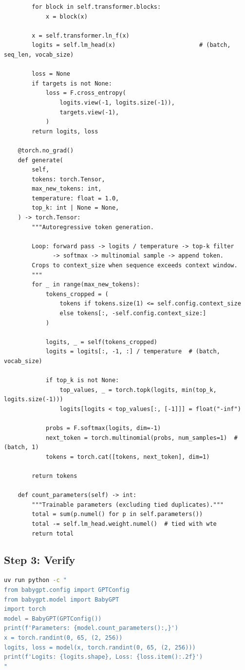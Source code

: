 \begin{lstlisting}
        for block in self.transformer.blocks:
            x = block(x)

        x = self.transformer.ln_f(x)
        logits = self.lm_head(x)                        # (batch, seq_len, vocab_size)

        loss = None
        if targets is not None:
            loss = F.cross_entropy(
                logits.view(-1, logits.size(-1)),
                targets.view(-1),
            )
        return logits, loss

    @torch.no_grad()
    def generate(
        self,
        tokens: torch.Tensor,
        max_new_tokens: int,
        temperature: float = 1.0,
        top_k: int | None = None,
    ) -> torch.Tensor:
        """Autoregressive token generation.

        Loop: forward pass -> logits / temperature -> top-k filter
              -> softmax -> multinomial sample -> append token.
        Crops to context_size when sequence exceeds context window.
        """
        for _ in range(max_new_tokens):
            tokens_cropped = (
                tokens if tokens.size(1) <= self.config.context_size
                else tokens[:, -self.config.context_size:]
            )

            logits, _ = self(tokens_cropped)
            logits = logits[:, -1, :] / temperature  # (batch, vocab_size)

            if top_k is not None:
                top_values, _ = torch.topk(logits, min(top_k, logits.size(-1)))
                logits[logits < top_values[:, [-1]]] = float("-inf")

            probs = F.softmax(logits, dim=-1)
            next_token = torch.multinomial(probs, num_samples=1)  # (batch, 1)
            tokens = torch.cat([tokens, next_token], dim=1)

        return tokens

    def count_parameters(self) -> int:
        """Trainable parameters (excluding tied duplicates)."""
        total = sum(p.numel() for p in self.parameters())
        total -= self.lm_head.weight.numel()  # tied with wte
        return total
\end{lstlisting}

\subsection{Step 3: Verify}

\shelltag
\begin{lstlisting}[language=bash]
uv run python -c "
from babygpt.config import GPTConfig
from babygpt.model import BabyGPT
import torch
model = BabyGPT(GPTConfig())
print(f'Parameters: {model.count_parameters():,}')
x = torch.randint(0, 65, (2, 256))
logits, loss = model(x, torch.randint(0, 65, (2, 256)))
print(f'Logits: {logits.shape}, Loss: {loss.item():.2f}')
"
\end{lstlisting}

